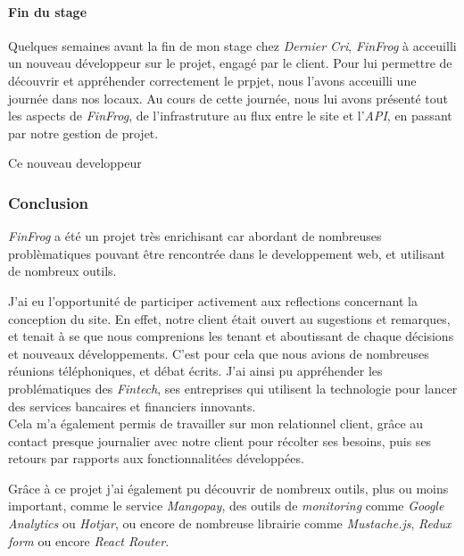 \documentclass[12pt,a4paper]{article}
\begin{document}
  \bigskip

  \paragraph{Fin du stage}\label{fin-du-stage}

  Quelques semaines avant la fin de mon stage chez \emph{Dernier Cri},
  \emph{FinFrog} à acceuilli un nouveau développeur sur le projet, engagé
  par le client. Pour lui permettre de découvrir et appréhender
  correctement le prpjet, nous l'avons acceuilli une journée dans nos
  locaux. Au cours de cette journée, nous lui avons présenté tout les
  aspects de \emph{FinFrog}, de l'infrastruture au flux entre le site et
  l'\emph{API}, en passant par notre gestion de projet.

  \bigskip

  Ce nouveau developpeur

  \subsubsection{Conclusion}\label{conclusion-1}

  \emph{FinFrog} a été un projet très enrichisant car abordant de
  nombreuses problèmatiques pouvant être rencontrée dans le developpement
  web, et utilisant de nombreux outils.

  \bigskip

  J'ai eu l'opportunité de participer activement aux reflections
  concernant la conception du site. En effet, notre client était ouvert au
  sugestions et remarques, et tenait à se que nous comprenions les tenant
  et aboutissant de chaque décisions et nouveaux développements. C'est
  pour cela que nous avions de nombreuses réunions téléphoniques, et débat
  écrits. J'ai ainsi pu appréhender les problématiques des \emph{Fintech},
  ses entreprises qui utilisent la technologie pour lancer des services
  bancaires et financiers innovants.\\
  Cela m'a également permis de travailler sur mon relationnel client,
  grâce au contact presque journalier avec notre client pour récolter ses
  besoins, puis ses retours par rapports aux fonctionnalitées développées.

  \bigskip

  Grâce à ce projet j'ai également pu découvrir de nombreux outils, plus
  ou moins important, comme le service \emph{Mangopay}, des outils de
  \emph{monitoring} comme \emph{Google Analytics} ou \emph{Hotjar}, ou
  encore de nombreuse librairie comme \emph{Mustache.js}, \emph{Redux
  form} ou encore \emph{React Router}.
\end{document}
